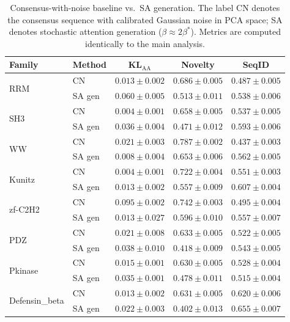 \documentclass[10pt]{article}
\begin{document}
\begin{table}[ht]
\centering
\caption{Consensus-with-noise baseline vs.\ SA generation. The label CN denotes the consensus sequence with calibrated Gaussian noise in PCA space; SA denotes stochastic attention generation ($\beta \approx 2\beta^*$). Metrics are computed identically to the main analysis.}
\label{tab:consensus-baseline}
\small
\begin{tabular}{@{}llccc@{}}
\toprule
Family & Method & KL$_{\mathrm{AA}}$ & Novelty & SeqID \\
\midrule
\multirow{2}{*}{RRM}
 & CN & $0.013 \pm 0.002$ & $0.686 \pm 0.005$ & $0.487 \pm 0.005$ \\
 & SA gen & $0.060 \pm 0.005$ & $0.513 \pm 0.011$ & $0.538 \pm 0.006$ \\
\midrule
\multirow{2}{*}{SH3}
 & CN & $0.004 \pm 0.001$ & $0.658 \pm 0.005$ & $0.537 \pm 0.005$ \\
 & SA gen & $0.036 \pm 0.004$ & $0.471 \pm 0.012$ & $0.593 \pm 0.006$ \\
\midrule
\multirow{2}{*}{WW}
 & CN & $0.021 \pm 0.003$ & $0.787 \pm 0.002$ & $0.437 \pm 0.003$ \\
 & SA gen & $0.008 \pm 0.004$ & $0.653 \pm 0.006$ & $0.562 \pm 0.005$ \\
\midrule
\multirow{2}{*}{Kunitz}
 & CN & $0.004 \pm 0.001$ & $0.722 \pm 0.004$ & $0.551 \pm 0.003$ \\
 & SA gen & $0.013 \pm 0.002$ & $0.557 \pm 0.009$ & $0.607 \pm 0.004$ \\
\midrule
\multirow{2}{*}{zf-C2H2}
 & CN & $0.095 \pm 0.002$ & $0.742 \pm 0.003$ & $0.495 \pm 0.004$ \\
 & SA gen & $0.013 \pm 0.027$ & $0.596 \pm 0.010$ & $0.557 \pm 0.007$ \\
\midrule
\multirow{2}{*}{PDZ}
 & CN & $0.021 \pm 0.008$ & $0.633 \pm 0.005$ & $0.522 \pm 0.005$ \\
 & SA gen & $0.038 \pm 0.010$ & $0.418 \pm 0.009$ & $0.543 \pm 0.005$ \\
\midrule
\multirow{2}{*}{Pkinase}
 & CN & $0.015 \pm 0.001$ & $0.630 \pm 0.005$ & $0.528 \pm 0.004$ \\
 & SA gen & $0.035 \pm 0.001$ & $0.478 \pm 0.011$ & $0.515 \pm 0.004$ \\
\midrule
\multirow{2}{*}{Defensin\_beta}
 & CN & $0.013 \pm 0.002$ & $0.631 \pm 0.005$ & $0.620 \pm 0.006$ \\
 & SA gen & $0.022 \pm 0.003$ & $0.402 \pm 0.013$ & $0.655 \pm 0.007$ \\
\bottomrule
\end{tabular}
\end{table}
\end{document}
